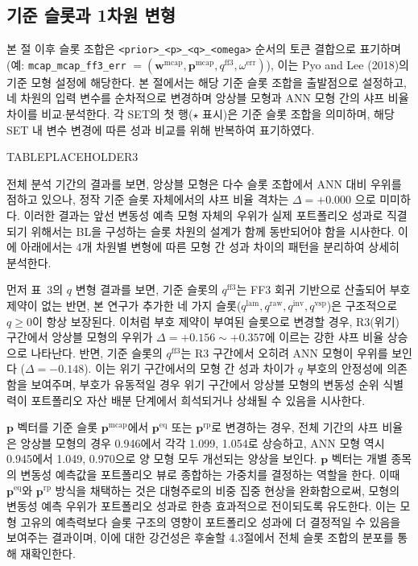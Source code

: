 \documentclass{article}
\begin{document}
\subsection{기준 슬롯과 1차원 변형}\label{subsec:baseline_slot}

본 절 이후 슬롯 조합은 \texttt{<prior>\_<p>\_<q>\_<omega>} 순서의 토큰 결합으로 표기하며 (예: \texttt{mcap\_mcap\_ff3\_err} $= (\mathbf{w}^{\mathrm{mcap}}, \mathbf{p}^{\mathrm{mcap}}, q^{\mathrm{ff3}}, \omega^{\mathrm{err}})$), 이는 Pyo and Lee (2018)의 기준 모형 설정에 해당한다. 본 절에서는 해당 기준 슬롯 조합을 출발점으로 설정하고, 네 차원의 입력 변수를 순차적으로 변경하며 앙상블 모형과 ANN 모형 간의 샤프 비율 차이를 비교$\cdot$분석한다. 각 SET의 첫 행($\star$ 표시)은 기준 슬롯 조합을 의미하며, 해당 SET 내 변수 변경에 따른 성과 비교를 위해 반복하여 표기하였다.



TABLEPLACEHOLDER3



전체 분석 기간의 결과를 보면, 앙상블 모형은 다수 슬롯 조합에서 ANN 대비 우위를 점하고 있으나, 정작 기준 슬롯 자체에서의 샤프 비율 격차는 $\Delta = +0.000$ 으로 미미하다. 이러한 결과는 앞선 변동성 예측 모형 자체의 우위가 실제 포트폴리오 성과로 직결되기 위해서는 BL을 구성하는 슬롯 차원의 설계가 함께 동반되어야 함을 시사한다. 이에 아래에서는 4개 차원별 변형에 따른 모형 간 성과 차이의 패턴을 분리하여 상세히 분석한다.

먼저 표~3의 $q$ 변형 결과를 보면, 기준 슬롯의 $q^{\mathrm{ff3}}$는 FF3 회귀 기반으로 산출되어 부호 제약이 없는 반면, 본 연구가 추가한 네 가지 슬롯($q^{\mathrm{lam}}, q^{\mathrm{raw}}, q^{\mathrm{inv}}, q^{\mathrm{vsp}}$)은 구조적으로 $q \geq 0$이 항상 보장된다. 이처럼 부호 제약이 부여된 슬롯으로 변경할 경우, R3(위기) 구간에서 앙상블 모형의 우위가 $\Delta = +0.156 \sim +0.357$에 이르는 강한 샤프 비율 상승으로 나타난다. 반면, 기준 슬롯의 $q^{\mathrm{ff3}}$는 R3 구간에서 오히려 ANN 모형이 우위를 보인다 ($\Delta = -0.148$). 이는 위기 구간에서의 모형 간 성과 차이가 $q$ 부호의 안정성에 의존함을 보여주며, 부호가 유동적일 경우 위기 구간에서 앙상블 모형의 변동성 순위 식별력이 포트폴리오 자산 배분 단계에서 희석되거나 상쇄될 수 있음을 시사한다.

$\mathbf{p}$ 벡터를 기준 슬롯 $\mathbf{p}^{\mathrm{mcap}}$에서 $\mathbf{p}^{\mathrm{eq}}$ 또는 $\mathbf{p}^{\mathrm{rp}}$로 변경하는 경우, 전체 기간의 샤프 비율은 앙상블 모형의 경우 0.946에서 각각 1.099, 1.054로 상승하고, ANN 모형 역시 0.945에서 1.049, 0.970으로 양 모형 모두 개선되는 양상을 보인다. $\mathbf{p}$ 벡터는 개별 종목의 변동성 예측값을 포트폴리오 뷰로 종합하는 가중치를 결정하는 역할을 한다. 이때 $\mathbf{p}^{\mathrm{eq}}$와 $\mathbf{p}^{\mathrm{rp}}$ 방식을 채택하는 것은 대형주로의 비중 집중 현상을 완화함으로써, 모형의 변동성 예측 우위가 포트폴리오 성과로 한층 효과적으로 전이되도록 유도한다. 이는 모형 고유의 예측력보다 슬롯 구조의 영향이 포트폴리오 성과에 더 결정적일 수 있음을 보여주는 결과이며, 이에 대한 강건성은 후술할  4.3절에서 전체 슬롯 조합의 분포를 통해 재확인한다. 
\end{document}

